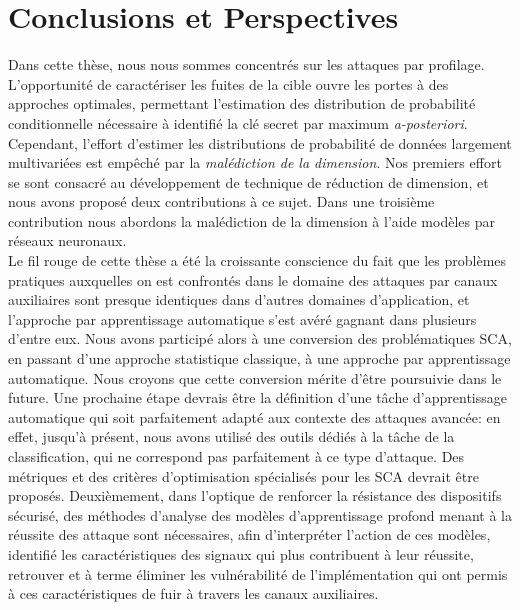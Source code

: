 \section{Conclusions et Perspectives}\label{sec:conclusions}

Dans cette thèse, nous nous sommes concentrés sur les attaques par profilage. L'opportunité de caractériser les fuites de la cible ouvre les portes à des approches optimales, permettant l'estimation des distribution de probabilité conditionnelle nécessaire à identifié la clé secret par maximum \emph{a-posteriori}. Cependant, l'effort d'estimer les distributions de probabilité de données largement multivariées est empêché par la \emph{malédiction de la dimension}. Nos premiers effort se sont consacré au développement de technique de réduction de dimension, et nous avons proposé deux contributions à ce sujet. Dans une troisième contribution nous abordons la malédiction de la dimension à l'aide modèles par réseaux neuronaux. \\

Le fil rouge de cette thèse a été la croissante conscience du fait que les problèmes pratiques auxquelles on est confrontés dans le domaine des attaques par canaux auxiliaires sont presque identiques dans d'autres domaines d'application, et l'approche par apprentissage automatique s'est avéré gagnant dans plusieurs d'entre eux. Nous avons participé alors à une conversion des problématiques SCA, en passant d'une approche statistique classique, à une approche par apprentissage automatique. Nous croyons que cette conversion mérite d'être poursuivie dans le future. Une prochaine étape devrais \^etre la définition d'une t\^ache d'apprentissage automatique qui soit parfaitement adapté aux contexte des attaques avancée: en effet, jusqu'à présent, nous avons utilisé des outils dédiés à la t\^ache de la classification, qui ne correspond pas parfaitement à ce type d'attaque. Des métriques et des critères d'optimisation spécialisés pour les SCA devrait être proposés. Deuxièmement, dans l'optique de renforcer la résistance des dispositifs sécurisé, des méthodes d'analyse des modèles d'apprentissage profond menant à la réussite des attaque sont nécessaires, afin d'interpréter l'action de ces modèles, identifié les caractéristiques des signaux qui plus contribuent à leur réussite, retrouver et à terme éliminer les vulnérabilité de l'implémentation qui ont permis à ces caractéristiques de fuir à travers les canaux auxiliaires. 